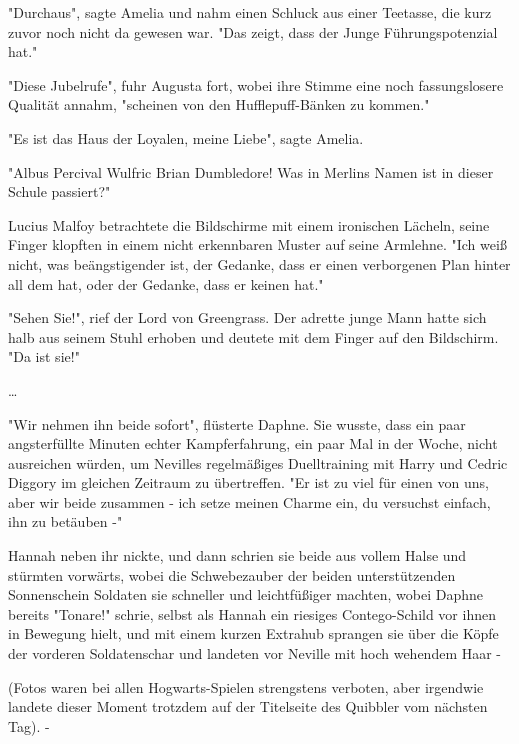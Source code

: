 {"Durchaus", sagte Amelia und nahm einen Schluck aus einer Teetasse, die kurz zuvor noch nicht da gewesen war. "Das zeigt, dass der Junge Führungspotenzial hat."

"Diese Jubelrufe", fuhr Augusta fort, wobei ihre Stimme eine noch fassungslosere Qualität annahm, "scheinen von den Hufflepuff-Bänken zu kommen."

"Es ist das Haus der Loyalen, meine Liebe", sagte Amelia.

"Albus Percival Wulfric Brian Dumbledore! Was in Merlins Namen ist in dieser Schule passiert?"

Lucius Malfoy betrachtete die Bildschirme mit einem ironischen Lächeln, seine Finger klopften in einem nicht erkennbaren Muster auf seine Armlehne. "Ich weiß nicht, was beängstigender ist, der Gedanke, dass er einen verborgenen Plan hinter all dem hat, oder der Gedanke, dass er keinen hat."

"Sehen Sie!", rief der Lord von Greengrass. Der adrette junge Mann hatte sich halb aus seinem Stuhl erhoben und deutete mit dem Finger auf den Bildschirm. "Da ist sie!"

…

"Wir nehmen ihn beide sofort", flüsterte Daphne. Sie wusste, dass ein paar angsterfüllte Minuten echter Kampferfahrung, ein paar Mal in der Woche, nicht ausreichen würden, um Nevilles regelmäßiges Duelltraining mit Harry und Cedric Diggory im gleichen Zeitraum zu übertreffen. "Er ist zu viel für einen von uns, aber wir beide zusammen - ich setze meinen Charme ein, du versuchst einfach, ihn zu betäuben -"

Hannah neben ihr nickte, und dann schrien sie beide aus vollem Halse und stürmten vorwärts, wobei die Schwebezauber der beiden unterstützenden Sonnenschein Soldaten sie schneller und leichtfüßiger machten, wobei Daphne bereits "Tonare!" schrie, selbst als Hannah ein riesiges Contego-Schild vor ihnen in Bewegung hielt, und mit einem kurzen Extrahub sprangen sie über die Köpfe der vorderen Soldatenschar und landeten vor Neville mit hoch wehendem Haar -

(Fotos waren bei allen Hogwarts-Spielen strengstens verboten, aber irgendwie landete dieser Moment trotzdem auf der Titelseite des Quibbler vom nächsten Tag). -

}

